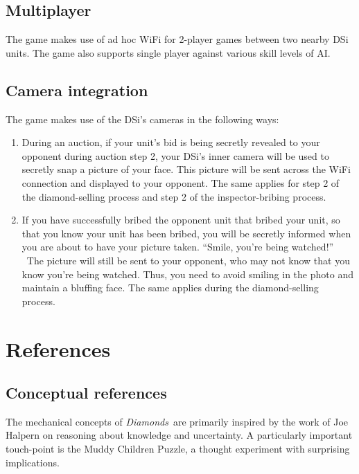 \documentclass[8pt]{extarticle}
\newcommand{\gtitle}{{\it Diamonds}}
\begin{document}
\subsection{Multiplayer}

The game makes use of ad hoc WiFi for 2-player games between two nearby DSi units.  The game also supports single player against various skill levels of AI.

\subsection{Camera integration}
The game makes use of the DSi's cameras in the following ways:
\begin{enumerate}

\item During an auction, if your unit's bid is being secretly revealed to your opponent during auction step 2, your DSi's inner camera will be used to secretly snap a picture of your face.  This picture will be sent across the WiFi connection and displayed to your opponent.  The same applies for step 2 of the diamond-selling process and step 2 of the inspector-bribing process.

\item If you have successfully bribed the opponent unit that bribed your unit, so that you know your unit has been bribed, you will be secretly informed when you are about to have your picture taken.  ``Smile, you're being watched!'' \  The picture will still be sent to your opponent, who may not know that you know you're being watched.  Thus, you need to avoid smiling in the photo and maintain a bluffing face.  The same applies during the diamond-selling process.

\end{enumerate}

\section{References}

\subsection{Conceptual references}
The mechanical concepts of \gtitle\ are primarily inspired by the work of Joe Halpern on reasoning about knowledge and uncertainty.  A particularly important touch-point is the Muddy Children Puzzle, a thought experiment with surprising implications.
\end{document}
